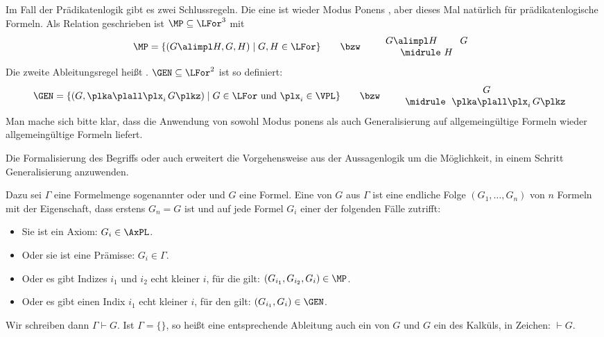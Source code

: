 %
Im Fall der Prädikatenlogik gibt es zwei Schlussregeln.
%
Die eine ist wieder Modus Ponens%
, aber dieses Mal natürlich für
prädikatenlogische Formeln.
% 
Als Relation geschrieben ist 
$\MP\subseteq\LFor^3$ mit
\[
  \MP = \{ (G\alimpl H, G, H) \mid  G, H \in\LFor \} \text{\qquad\bzw\qquad}
  \text{\begin{tabular}{c}
          $G \alimpl H$ \qquad $G$ \\
          \midrule
          $H$
        \end{tabular}} 
\]
%
Die zweite Ableitungsregel heißt
%
. 
%
$\GEN\subseteq\LFor^2$ ist so definiert:
%
\[
  \GEN = \{ (G, \plka\plall\plx_i \, G\plkz) \mid  G \in\LFor \text{ und }\plx_i\in\VPL\} \text{\qquad\bzw\qquad}
  \text{\begin{tabular}{c}
          $G$ \\
          \midrule
          $\;\plka\plall\plx_i \, G\plkz\;$
        \end{tabular}} 
\]
%
Man mache sich bitte klar, dass die Anwendung von sowohl Modus ponens
als auch Generalisierung auf allgemeingültige Formeln wieder
allgemeingültige Formeln liefert.

Die Formalisierung des Begriffs  oder auch
 erweitert die
Vorgehensweise aus der Aussagenlogik um die Möglichkeit, in einem
Schritt Generalisierung anzuwenden.

Dazu sei $\Gamma$ eine Formelmenge sogenannter
 oder  und
$G$ eine Formel.
%
Eine  von $G$
aus $\Gamma$
ist eine endliche Folge $(G_1,\dots,G_n)$
von $n$
Formeln mit der Eigenschaft, dass erstens $G_n=G$
ist und auf jede Formel $G_i$ einer der folgenden Fälle zutrifft:

\begin{itemize}
\item Sie ist ein Axiom: $G_i\in\AxPL$.
\item Oder sie ist eine Prämisse: $G_i\in\Gamma$.
\item Oder es gibt Indizes $i_1$ und $i_2$ echt kleiner $i$, für die gilt:
  $(G_{i_1},G_{i_2},G_i)\in\MP$.
\item Oder es gibt einen Indix $i_1$ echt kleiner $i$, für den gilt:
  $(G_{i_1},G_i)\in\GEN$.
\end{itemize}
%
Wir schreiben dann $\Gamma\vdash G$.
%
Ist $\Gamma=\{\}$, so heißt eine entsprechende Ableitung auch ein
 von $G$ und $G$ ein %
des Kalküls, in Zeichen: $\vdash G$.

